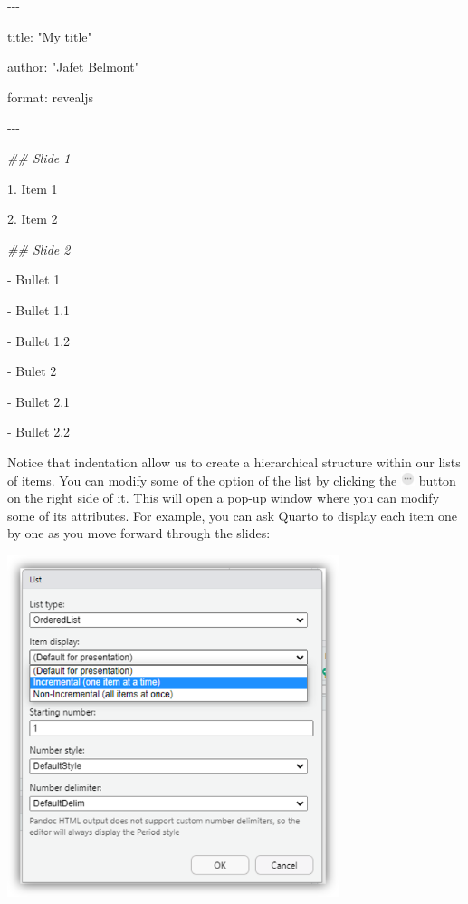 \documentclass[
  letterpaper,
  DIV=11,
  numbers=noendperiod]{scrartcl}
\newenvironment{Shaded}{\begin{snugshade}}{\end{snugshade}}
\newcommand{\DecValTok}[1]{\textcolor[rgb]{0.68,0.00,0.00}{#1}}
\newcommand{\DocumentationTok}[1]{\textcolor[rgb]{0.37,0.37,0.37}{\textit{#1}}}
\newcommand{\FloatTok}[1]{\textcolor[rgb]{0.68,0.00,0.00}{#1}}
\newcommand{\NormalTok}[1]{\textcolor[rgb]{0.00,0.23,0.31}{#1}}
\newcommand{\SpecialCharTok}[1]{\textcolor[rgb]{0.37,0.37,0.37}{#1}}
\newcommand{\StringTok}[1]{\textcolor[rgb]{0.13,0.47,0.30}{#1}}
\begin{document}
\begin{Shaded}
\begin{Highlighting}[]

\SpecialCharTok{{-}{-}{-}}

\NormalTok{title}\SpecialCharTok{:} \StringTok{"My title"}

\NormalTok{author}\SpecialCharTok{:} \StringTok{"Jafet Belmont"}

\NormalTok{format}\SpecialCharTok{:}\NormalTok{ revealjs}

\SpecialCharTok{{-}{-}{-}}

\DocumentationTok{\#\# Slide 1}

\FloatTok{1.}\NormalTok{  Item }\DecValTok{1}

\FloatTok{2.}\NormalTok{  Item }\DecValTok{2}

\DocumentationTok{\#\# Slide 2}

\SpecialCharTok{{-}}\NormalTok{   Bullet }\DecValTok{1}

    \SpecialCharTok{{-}}\NormalTok{   Bullet }\FloatTok{1.1}

    \SpecialCharTok{{-}}\NormalTok{   Bullet }\FloatTok{1.2}

\SpecialCharTok{{-}}\NormalTok{   Bulet }\DecValTok{2}

    \SpecialCharTok{{-}}\NormalTok{   Bullet }\FloatTok{2.1}

    \SpecialCharTok{{-}}\NormalTok{   Bullet }\FloatTok{2.2}
\end{Highlighting}
\end{Shaded}

Notice that indentation allow us to create a hierarchical structure
within our lists of items. You can modify some of the option of the list
by clicking the
\includegraphics[width=0.15625in,height=\textheight]{images/threedots.png}
button on the right side of it. This will open a pop-up window where you
can modify some of its attributes. For example, you can ask Quarto to
display each item one by one as you move forward through the slides:

\begin{center}
\includegraphics[width=3.8125in,height=\textheight]{images/quarto11.png}
\end{center}
\end{document}
